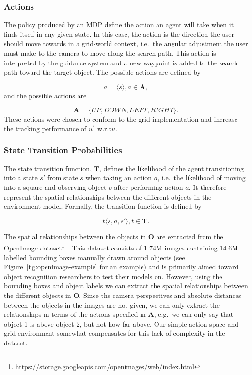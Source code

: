 \documentclass[a4paper, twoside]{article}
\begin{document}
\subsubsection{Actions}

The policy produced by an MDP define the action an agent will take when it finds itself in any given state. In this case, the action is the direction the user should move towards in a grid-world context, i.e.\ the angular adjustment the user must make to the camera to move along the search path. This action is interpreted by the guidance system and a new waypoint is added to the search path toward the target object. The possible actions are defined by

\begin{equation}
  a = \langle{}s\rangle, a\in{}\mathbf{A},
\end{equation}
and the possible actions are

\begin{equation}
  \mathbf{A} = \{UP, DOWN, LEFT, RIGHT\}.
\end{equation}
These actions were chosen to conform to the grid implementation and increase the tracking performance of $u^*$ w.r.t\@ $u$. 

\subsubsection{State Transition Probabilities}

\noindent The state transition function, $\mathbf{T}$, defines the likelihood of the agent transitioning into a state $s'$ from state $s$ when taking an action $a$, i.e.\ the likelihood of moving into a square and observing object $o$ after performing action $a$. It therefore represent the spatial relationships between the different objects in the environment model. Formally, the transition function is defined by

\begin{equation}
  t\langle{}s, a, s'\rangle, t\in{}\mathbf{T}.
\end{equation}

The spatial relationships between the objects in $\mathbf{O}$ are extracted from the OpenImage dataset\footnote{https://storage.googleapis.com/openimages/web/index.html}~\cite{openimages}. This dataset consists of 1.74M images containing 14.6M labelled bounding boxes manually drawn around objects (see Figure~\ref{fig:openimage-example} for an example) and is primarily aimed toward object recognition researchers to test their models on. However, using the bounding boxes and object labels we can extract the spatial relationships between the different objects in $\mathbf{O}$. Since the camera perspectives and absolute distances between the objects in the images are not given, we can only extract the relationships in terms of the actions specified in $\mathbf{A}$, e.g.\ we can only say that object 1 is above object 2, but not how far above. Our simple action-space and grid environment somewhat compensates for this lack of complexity in the dataset. 
\end{document}
